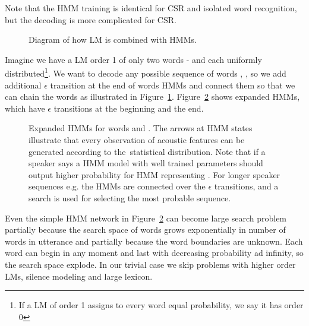 {Note that the \ac{HMM} training is identical for \ac{CSR} and isolated word recognition,
but the decoding is more complicated for \ac{CSR}.

\begin{figure}[!htp]
    \begin{center}
        
        \caption{Diagram of how \ac{LM} is combined with \acp{HMM}.}
        \label{fig:hmm_lm} 
    \end{center}
\end{figure}

Imagine we have a \ac{LM} order 1 of only two words -  and  each uniformly distributed\footnote{
If a \ac{LM} of order 1 assigns to every word equal probability, we say it has order 0}.
We want to decode any possible sequence of words , , so 
we add additional $\epsilon$ transition at the end of words \acp{HMM}
and connect them so that we can chain the words as illustrated in Figure~\ref{fig:hmm_lm}.
Figure~\ref{fig:hmm_alt} shows expanded \acp{HMM}, which have $\epsilon$ transitions
at the beginning and the end. 


\begin{figure}[!htp]
    \begin{center}
        
        \caption{Expanded \acp{HMM} for words  and . 
        The arrows at \ac{HMM} states illustrate that every observation of acoustic features 
        can be generated according to the~statistical distribution. 
        Note that if a speaker says  a \ac{HMM} model with well trained parameters should output higher probability
        for \ac{HMM} representing . For longer speaker sequences e.g.  the \acp{HMM} are connected over the 
$\epsilon$ transitions, and a search is used for selecting the most probable sequence.}
        \label{fig:hmm_alt} 
    \end{center}
\end{figure}

Even the simple \ac{HMM} network in Figure~\ref{fig:hmm_alt} can become
large search problem partially because the search space of words grows
exponentially in number of words in utterance and partially
because the word boundaries are unknown. 
Each word can begin in any moment and last with decreasing probability ad infinity,
so the search space explode.
In our trivial case we skip problems with higher order \acp{LM}, silence modeling
and large lexicon.

}
